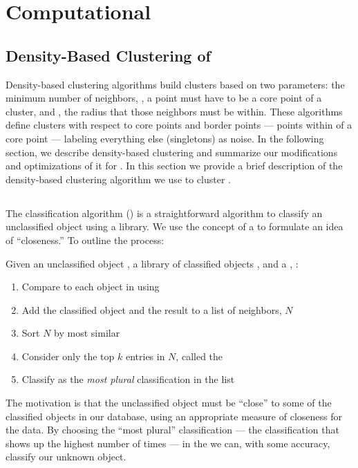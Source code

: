 \section{Computational}
\subsection{Density-Based Clustering of \Isols{}}\label{sec:dbscan}


Density-based clustering algorithms build clusters based on two parameters: the minimum number of neighbors, \minneigh{},  a point must have to be a core point of a cluster, and \eps{}, the 
radius that those neighbors must be within. 
These algorithms define clusters with respect to core points and border points --- points within \eps{} of a core point --- labeling everything else (singletons) as noise. 
In the following section, we describe density-based clustering and summarize our modifications and optimizations of it for \cplop{}. In this section we provide a brief description
of the density-based clustering algorithm we use to cluster \cplop{} \isols{} \cite{johnson2015density}.
\subsection{\kNNlong{}}
The \kNNlong{} classification algorithm (\kNN{}) is a straightforward algorithm to classify an unclassified object using a library. We use the concept of a \compfunc{} to formulate an idea of ``closeness.'' To outline the process:

Given an unclassified object \UNKNOWN{}, a library of classified objects \LIB{}, and a \compfunc{}, \COMP{}:
\begin{enumerate}
\item Compare \UNKNOWN{} to each object in \LIB{} using \COMP{}
\item Add the classified object and the result to a list of neighbors, $N$
\item Sort $N$ by most similar
\item Consider only the top $k$ entries in $N$, called the \knnlong{} \label{knn:filter}
\item Classify \UNKNOWN{} as the \textit{most plural} classification in the \knnlong{} list
\end{enumerate}

The motivation is that the unclassified object must be ``close'' to some of the classified objects in our database, using an appropriate measure of closeness for the data. By choosing the ``most plural'' classification --- the classification that shows up the highest number of times ---  in the \knnlong{} we can, with some accuracy, classify our unknown object.
